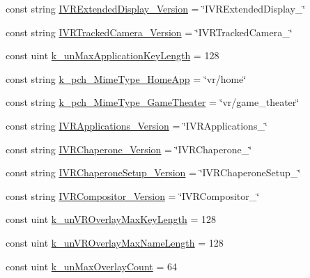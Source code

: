 \begin{DoxyCompactItemize}
\item 
const string \mbox{\hyperlink{class_valve_1_1_v_r_1_1_open_v_r_aa23faa2a4f0a66d9d7d6b7eb17e23b24}{I\+V\+R\+Extended\+Display\+\_\+\+Version}} = \char`\"{}I\+V\+R\+Extended\+Display\+\_\char`\"{}
\item 
const string \mbox{\hyperlink{class_valve_1_1_v_r_1_1_open_v_r_a0e31030fc9ac3933b2b3512029bb773c}{I\+V\+R\+Tracked\+Camera\+\_\+\+Version}} = \char`\"{}I\+V\+R\+Tracked\+Camera\+\_\char`\"{}
\item 
const uint \mbox{\hyperlink{class_valve_1_1_v_r_1_1_open_v_r_a46baebe39b86e3cb0e7d4b89ddfe92ee}{k\+\_\+un\+Max\+Application\+Key\+Length}} = 128
\item 
const string \mbox{\hyperlink{class_valve_1_1_v_r_1_1_open_v_r_ac2c63f1efa0cfd0f10eb96e64e98760b}{k\+\_\+pch\+\_\+\+Mime\+Type\+\_\+\+Home\+App}} = \char`\"{}vr/home\char`\"{}
\item 
const string \mbox{\hyperlink{class_valve_1_1_v_r_1_1_open_v_r_ab4d0ae43eb0360dd0f0c90cf9000ac7c}{k\+\_\+pch\+\_\+\+Mime\+Type\+\_\+\+Game\+Theater}} = \char`\"{}vr/game\+\_\+theater\char`\"{}
\item 
const string \mbox{\hyperlink{class_valve_1_1_v_r_1_1_open_v_r_a6e13b8af1718799a500a327fa54159f8}{I\+V\+R\+Applications\+\_\+\+Version}} = \char`\"{}I\+V\+R\+Applications\+\_\char`\"{}
\item 
const string \mbox{\hyperlink{class_valve_1_1_v_r_1_1_open_v_r_aaeb8ec4e9ccb91f84e38ff9180906abf}{I\+V\+R\+Chaperone\+\_\+\+Version}} = \char`\"{}I\+V\+R\+Chaperone\+\_\char`\"{}
\item 
const string \mbox{\hyperlink{class_valve_1_1_v_r_1_1_open_v_r_a1b3728fe2bee708e893bab2f55a16b4b}{I\+V\+R\+Chaperone\+Setup\+\_\+\+Version}} = \char`\"{}I\+V\+R\+Chaperone\+Setup\+\_\char`\"{}
\item 
const string \mbox{\hyperlink{class_valve_1_1_v_r_1_1_open_v_r_ac02a02f4790928a83f145b375ffec70b}{I\+V\+R\+Compositor\+\_\+\+Version}} = \char`\"{}I\+V\+R\+Compositor\+\_\char`\"{}
\item 
const uint \mbox{\hyperlink{class_valve_1_1_v_r_1_1_open_v_r_a0d02644bb895f7d1657363183a1452b4}{k\+\_\+un\+V\+R\+Overlay\+Max\+Key\+Length}} = 128
\item 
const uint \mbox{\hyperlink{class_valve_1_1_v_r_1_1_open_v_r_a8d5dba87fbd8aab0328046bc2bd1c99d}{k\+\_\+un\+V\+R\+Overlay\+Max\+Name\+Length}} = 128
\item 
const uint \mbox{\hyperlink{class_valve_1_1_v_r_1_1_open_v_r_a98eb8218263a2871eb506e57da93b74a}{k\+\_\+un\+Max\+Overlay\+Count}} = 64

\end{DoxyCompactItemize}
